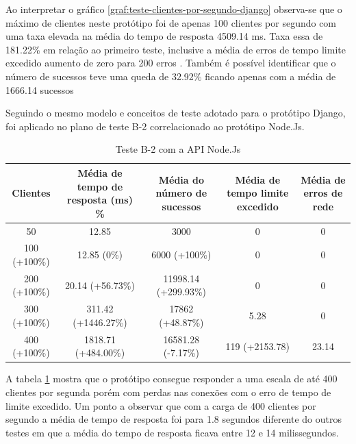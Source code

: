   Ao interpretar o gráfico \ref{graf:teste-clientes-por-segundo-django}  observa-se que o máximo de clientes neste protótipo
  foi de apenas 100 clientes por segundo com uma taxa elevada na média do tempo de resposta 4509.14 ms. Taxa essa de 181.22\%
  em relação ao primeiro teste, inclusive a média de erros de tempo limite excedido aumento de zero para 200 erros . 
  Também é possível identificar que o número de sucessos teve uma queda de 32.92\% ficando apenas
  com a média de 1666.14 sucessos
 
  Seguindo o mesmo modelo e conceitos de teste adotado para o protótipo Django, foi aplicado no plano de teste 
  B-2 correlacionado ao protótipo Node.Js.
  
  \begin{table}[H]
    \centering
    \footnotesize
    \setlength{\abovecaptionskip}{0pt}
    \setlength{\belowcaptionskip}{0pt}
    \caption[Teste B-2 com a API Node.Js]{Teste B-2 com a API Node.Js}
    \label{tab:teste-b-2}
    \begin{tabular}{c|c|c|c|c}
      \hline \hline
      Clientes  & 	Média de tempo de resposta (ms) \% &	Média do número de sucessos & 	Média de tempo limite excedido &	Média de erros de rede \\ 
      \hline \hline
      50 &			12.85		 & 		3000 &					0 &					0 \\
      100 (+100\%)&		12.85 (0\%) & 			6000 (+100\%) & 			0 &					0 \\
      200 (+100\%)&		20.14 (+56.73\%) & 		11998.14 (+299.93\%) & 			0 &					0 \\
      300 (+100\%)&		311.42 (+1446.27\%) & 		17862 (+48.87\%) & 			5.28 &					0 \\
      400 (+100\%)&		1818.71 (+484.00\%) & 		16581.28 (-7.17\%) & 			119 (+2153.78) &			23.14 \\
      \hline \hline
    \end{tabular}
  \end{table}
  
  A tabela \ref{tab:teste-b-2} mostra que o protótipo consegue responder a uma escala de até 400 clientes por segunda
  porém com perdas nas conexões com o erro de tempo de limite excedido. Um ponto a observar que com a carga de 400 clientes por segundo 
  a média de tempo de resposta foi para 1.8 segundos diferente do outros testes em que a média do tempo de resposta ficava entre 12 e 14
  milissegundos.
  
